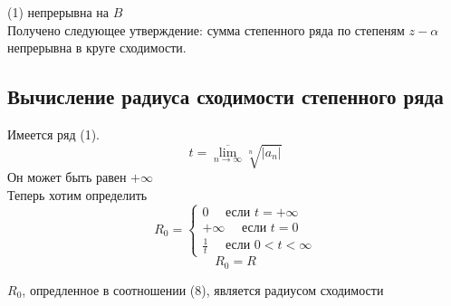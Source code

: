 \documentclass[main]{subfiles}
\begin{document}
(1) непрерывна на $B$ \\
Получено следующее утверждение: сумма степенного ряда по степеням $z-\alpha$ непрерывна в круге сходимости.

\subsection*{Вычисление радиуса сходимости степенного ряда}
Имеется ряд (1).
    \[t = \overline{\underset{n \to \infty}{\lim}} \sqrt[n]{|a_n|} \tag{7} \]
Он может быть равен $+\infty$ \\
Теперь хотим определить \[R_0 = \begin{cases}
    0 \quad \text{ если } t = +\infty \\
    +\infty \quad \text{ если } t = 0  \\
    \frac{1}{t} \quad \text{ если } 0 < t < \infty
\end{cases} \tag{8} \]
\[ R_0 = R \tag{9} \]
\begin{theorem}
    $R_0$, опредленное в соотношении (8), является радиусом сходимости
\end{theorem}
\end{document}
